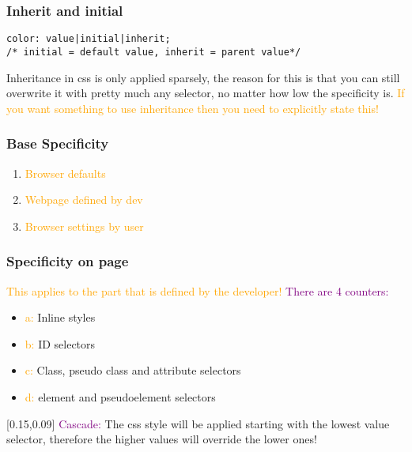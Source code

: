 \documentclass[main.tex,fontsize=6pt,paper=a4,paper=landscape,DIV=calc,]{scrartcl}
\begin{document}
\begin{multicols*}{4}
\subsubsection{Inherit and initial}
\vspace{-2mm}
\begin{lstlisting}
color: value|initial|inherit;
/* initial = default value, inherit = parent value*/
\end{lstlisting}
\vspace{2mm}
Inheritance in css is only applied sparsely, the reason for this is that you can still overwrite it with pretty much any selector, no matter how low the specificity is.\newline
\textcolor{orange}{If you want something to use inheritance then you need to explicitly state this!}

\subsubsection{Base Specificity}
\begin{enumerate}
\item \textcolor{orange}{Browser defaults}
\item \textcolor{orange}{Webpage defined by dev}
\item \textcolor{orange}{Browser settings by user}
\end{enumerate} 

\subsubsection{Specificity on page}
\textcolor{orange}{This applies to the part that is defined by the developer!}\newline
\textcolor{purple}{There are 4 counters:}
\begin{itemize}
\item \textcolor{orange}{a:} Inline styles
\item \textcolor{orange}{b:} ID selectors
\item \textcolor{orange}{c:} Class, pseudo class and attribute selectors
\item \textcolor{orange}{d:} element and pseudoelement selectors
\end{itemize}
[0.15,0.09]
\textcolor{purple}{Cascade:}\newline
The css style will be applied starting with the lowest value selector, therefore the higher values will override the lower ones!


\end{multicols*}
\end{document}

